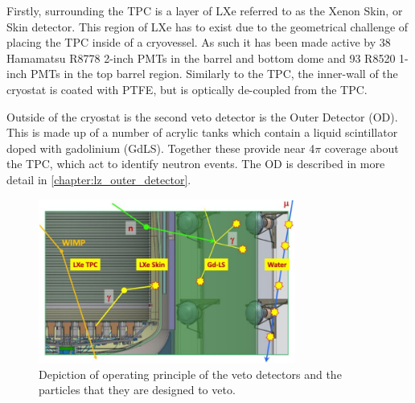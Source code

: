 \par
Firstly, surrounding the TPC is a layer of LXe referred to as the Xenon Skin, or Skin detector.
This region of LXe has to exist due to the geometrical challenge of placing the TPC inside of a cryovessel.
As such it has been made active by 38 Hamamatsu R8778 2-inch PMTs in the barrel and bottom dome and 93 R8520 1-inch PMTs in the top barrel region.
Similarly to the TPC, the inner-wall of the cryostat is coated with PTFE, but is optically de-coupled from the TPC.

\par
Outside of the cryostat is the second veto detector is the Outer Detector (OD).
This is made up of a number of acrylic tanks which contain a liquid scintillator doped with gadolinium (GdLS).
Together these provide near 4$\pi$ coverage about the TPC, which act to identify neutron events.
The OD is described in more detail in \autoref{chapter:lz_outer_detector}.

\begin{figure}
    \centering
    \includegraphics[width=0.75\textwidth]{Figures/LZ/lz_veto_plan.png}
    \caption{Depiction of operating principle of the veto detectors and the particles that they are designed to veto.}
    \label{fig:LZ_Veto_Principle}
\end{figure}


